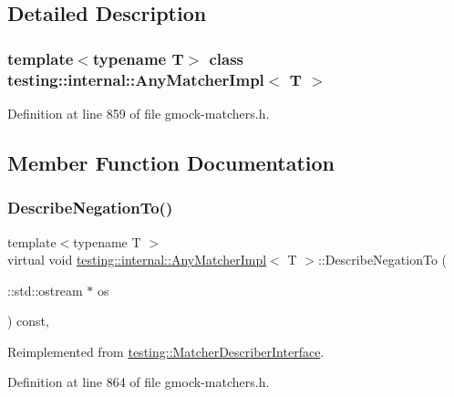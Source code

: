\subsection{Detailed Description}
\subsubsection*{template$<$typename T$>$\newline
class testing\+::internal\+::\+Any\+Matcher\+Impl$<$ T $>$}



Definition at line 859 of file gmock-\/matchers.\+h.



\subsection{Member Function Documentation}
\mbox{\label{classtesting_1_1internal_1_1AnyMatcherImpl_ac6570e881174ba774b8d56abaa4f7d25}} 
\subsubsection{\texorpdfstring{Describe\+Negation\+To()}{DescribeNegationTo()}}
{\footnotesize\ttfamily template$<$typename T $>$ \\
virtual void \hyperlink{classtesting_1_1internal_1_1AnyMatcherImpl}{testing\+::internal\+::\+Any\+Matcher\+Impl}$<$ T $>$\+::Describe\+Negation\+To (\begin{DoxyParamCaption}\item[{\+::std\+::ostream $\ast$}]{os }\end{DoxyParamCaption}) const\hspace{0.3cm}{\ttfamily [inline]}, {\ttfamily [virtual]}}



Reimplemented from \hyperlink{classtesting_1_1MatcherDescriberInterface_a2071afbc47097c4d1c0064275af34db0}{testing\+::\+Matcher\+Describer\+Interface}.



Definition at line 864 of file gmock-\/matchers.\+h.


